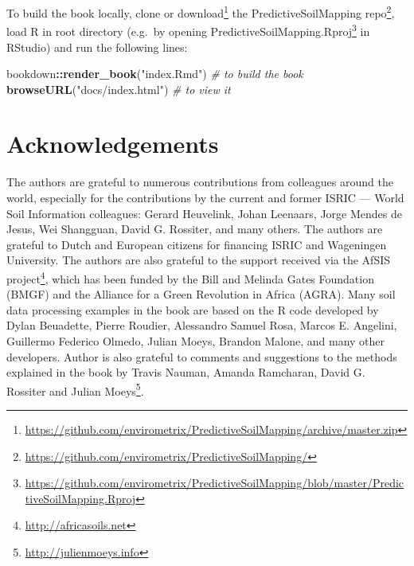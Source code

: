 \documentclass[graybox,natbib,nospthms,UStrade]{svmono}
\newenvironment{Shaded}{\begin{snugshade}}{\end{snugshade}}
\newcommand{\CommentTok}[1]{\textcolor[rgb]{0.37,0.37,0.37}{\textit{#1}}}
\newcommand{\KeywordTok}[1]{\textcolor[rgb]{0.27,0.27,0.27}{\textbf{#1}}}
\newcommand{\NormalTok}[1]{#1}
\newcommand{\OperatorTok}[1]{\textcolor[rgb]{0.43,0.43,0.43}{\textbf{#1}}}
\newcommand{\StringTok}[1]{\textcolor[rgb]{0.5,0.5,0.5}{#1}}
\renewcommand{\href}[2]{#2 (\url{#1})}
\renewcommand{\href}[2]{#2\footnote{\url{#1}}}
\begin{document}
To build the book locally, clone or \href{https://github.com/envirometrix/PredictiveSoilMapping/archive/master.zip}{download} the \href{https://github.com/envirometrix/PredictiveSoilMapping/}{PredictiveSoilMapping repo}, load R in root directory (e.g.~by opening \href{https://github.com/envirometrix/PredictiveSoilMapping/blob/master/PredictiveSoilMapping.Rproj}{PredictiveSoilMapping.Rproj} in RStudio) and run the following lines:

\begin{Shaded}
\begin{Highlighting}[]
\NormalTok{bookdown}\OperatorTok{::}\KeywordTok{render_book}\NormalTok{(}\StringTok{"index.Rmd"}\NormalTok{) }\CommentTok{# to build the book}
\KeywordTok{browseURL}\NormalTok{(}\StringTok{"docs/index.html"}\NormalTok{) }\CommentTok{# to view it}
\end{Highlighting}
\end{Shaded}

\hypertarget{acknowledgements}{%
\section*{Acknowledgements}\label{acknowledgements}}

The authors are grateful to numerous contributions from colleagues around the world, especially for the contributions by the current and former ISRIC --- World Soil Information colleagues: Gerard Heuvelink, Johan Leenaars, Jorge Mendes de Jesus, Wei Shangguan, David G. Rossiter, and many others. The authors are grateful to Dutch and European citizens for financing ISRIC and Wageningen University. The authors are also grateful to the support received via the \href{http://africasoils.net}{AfSIS project}, which has been funded by the Bill and Melinda Gates Foundation (BMGF) and the Alliance for a Green Revolution in Africa (AGRA). Many soil data processing examples in the book are based on the R code developed by Dylan Beuadette, Pierre Roudier, Alessandro Samuel Rosa, Marcos E. Angelini, Guillermo Federico Olmedo, Julian Moeys, Brandon Malone, and many other developers. Author is also grateful to comments and suggestions to the methods explained in the book by Travis Nauman, Amanda Ramcharan, David G. Rossiter and \href{http://julienmoeys.info}{Julian Moeys}.
\end{document}
